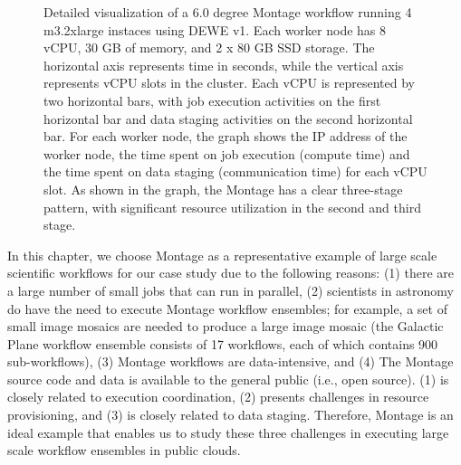 \begin{figure}[ht]
\centering
{}
\caption{Detailed visualization of a 6.0 degree Montage workflow running 4 m3.2xlarge instaces using DEWE v1. Each worker node has 8 vCPU, 30 GB of memory, and 2 x 80 GB SSD storage. The horizontal axis represents time in seconds, while the vertical axis represents vCPU slots in the cluster. Each vCPU is represented by two horizontal bars, with job execution activities on the first horizontal bar and data staging activities on the second horizontal bar. For each worker node, the graph shows the IP address of the worker node, the time spent on job execution (compute time) and the time spent on data staging (communication time) for each vCPU slot. As shown in the graph, the Montage has a clear three-stage pattern, with significant resource utilization in the second and third stage.}
\label{fig:montage_visualization}
\end{figure}

In this chapter, we choose Montage as a representative example of large scale scientific workflows for our case study due to the following reasons:  (1) there are a large number of small jobs that can run in parallel, (2) scientists in astronomy do have the need to execute Montage workflow ensembles; for example, a set of small image mosaics are needed to produce a large image mosaic (the Galactic Plane workflow ensemble \cite{deelman2013hosted} consists of 17 workflows, each of which contains 900 sub-workflows), (3) Montage workflows are data-intensive, and (4) The Montage source code and data is available to the general public (i.e., open source). (1) is closely related to execution coordination, (2) presents challenges in resource provisioning, and (3) is closely related to data staging. Therefore, Montage is an ideal example that enables us to study these three challenges in executing large scale workflow ensembles in public clouds.


